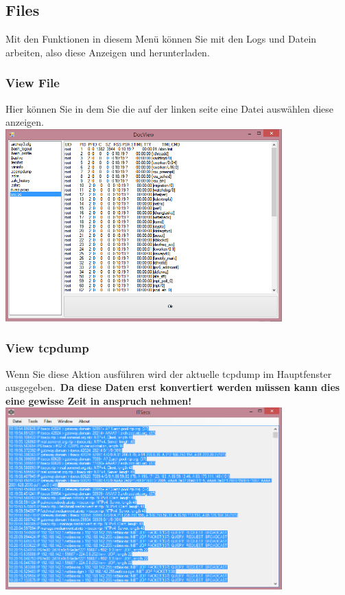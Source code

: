 \documentclass[11pt]{article} %
\begin{document}
\subsection{Files}
Mit den Funktionen in diesem Menü können Sie mit den Logs und Datein arbeiten, also diese Anzeigen und herunterladen.\\
\subsubsection{View File}
Hier können Sie in dem Sie die auf der linken seite eine Datei auswählen diese anzeigen.\\
\includegraphics[width=0.8\textwidth]{view_file}
\pagebreak
\subsubsection{View tcpdump}
Wenn Sie diese Aktion ausführen wird der aktuelle tcpdump im Hauptfenster ausgegeben.\
\textbf{Da diese Daten erst konvertiert werden müssen kann dies eine gewisse Zeit in anspruch nehmen!}\\
\includegraphics[width=0.8\textwidth]{view_tcpd}
\\
\end{document}
